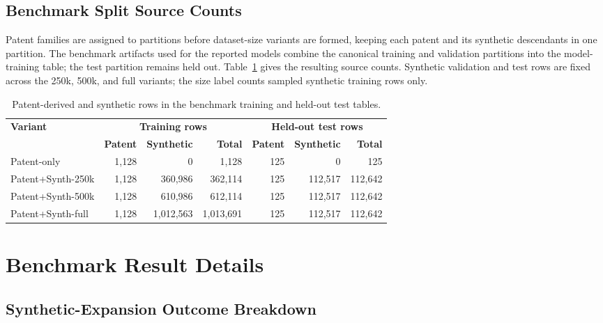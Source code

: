 \subsection{Benchmark Split Source Counts}

Patent families are assigned to partitions before dataset-size variants are formed, keeping each patent and its synthetic descendants in one partition. The benchmark artifacts used for the reported models combine the canonical training and validation partitions into the model-training table; the test partition remains held out. Table~\ref{tab:canonical_split_source_breakdown} gives the resulting source counts. Synthetic validation and test rows are fixed across the 250k, 500k, and full variants; the size label counts sampled synthetic training rows only.

\begin{table}[htbp]
\centering
\footnotesize
\setlength{\tabcolsep}{4pt}
\caption{Patent-derived and synthetic rows in the benchmark training and held-out test tables.}
\label{tab:canonical_split_source_breakdown}
\begin{tabular}{lrrrrrr}
\toprule
\textbf{Variant} & \multicolumn{3}{c}{\textbf{Training rows}} & \multicolumn{3}{c}{\textbf{Held-out test rows}} \\
\cmidrule(lr){2-4}\cmidrule(lr){5-7}
 & \textbf{Patent} & \textbf{Synthetic} & \textbf{Total} & \textbf{Patent} & \textbf{Synthetic} & \textbf{Total} \\
\midrule
Patent-only & 1,128 & 0 & 1,128 & 125 & 0 & 125 \\
Patent+Synth-250k & 1,128 & 360,986 & 362,114 & 125 & 112,517 & 112,642 \\
Patent+Synth-500k & 1,128 & 610,986 & 612,114 & 125 & 112,517 & 112,642 \\
Patent+Synth-full & 1,128 & 1,012,563 & 1,013,691 & 125 & 112,517 & 112,642 \\
\bottomrule
\end{tabular}
\end{table}

\section{Benchmark Result Details}
\label{app:benchmark_result_details}

\subsection{Synthetic-Expansion Outcome Breakdown}
\label{app:section_6_1_failure_breakdown}

